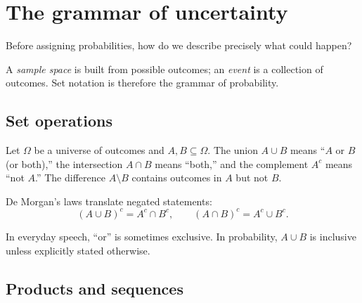 \chapter{The grammar of uncertainty}
\label{ch:counting}

\begin{question}
Before assigning probabilities, how do we describe precisely what could happen?
\end{question}

A \emph{sample space} is built from possible outcomes; an \emph{event} is a collection of outcomes. Set notation is therefore the grammar of probability.

\section{Set operations}

Let $\Omega$ be a universe of outcomes and $A,B\subseteq\Omega$. The union $A\cup B$ means ``$A$ or $B$ (or both),'' the intersection $A\cap B$ means ``both,'' and the complement $A^c$ means ``not $A$.'' The difference $A\setminus B$ contains outcomes in $A$ but not $B$.

\begin{center}
\end{center}

De Morgan's laws translate negated statements:
\[
(A\cup B)^c=A^c\cap B^c,
\qquad
(A\cap B)^c=A^c\cup B^c.
\]

\begin{warningbox}
In everyday speech, ``or'' is sometimes exclusive. In probability, $A\cup B$ is inclusive unless explicitly stated otherwise.
\end{warningbox}

\section{Products and sequences}

